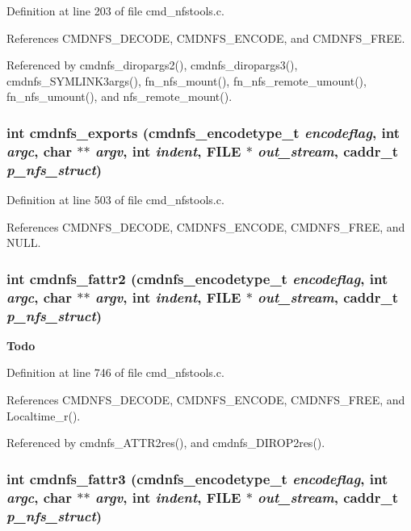 Definition at line 203 of file cmd\_\-nfstools.c.

References CMDNFS\_\-DECODE, CMDNFS\_\-ENCODE, and CMDNFS\_\-FREE.

Referenced by cmdnfs\_\-diropargs2(), cmdnfs\_\-diropargs3(), cmdnfs\_\-SYMLINK3args(), fn\_\-nfs\_\-mount(), fn\_\-nfs\_\-remote\_\-umount(), fn\_\-nfs\_\-umount(), and nfs\_\-remote\_\-mount().
\subsubsection{\setlength{\rightskip}{0pt plus 5cm}int cmdnfs\_\-exports ({\bf cmdnfs\_\-encodetype\_\-t} {\em encodeflag}, int {\em argc}, char $\ast$$\ast$ {\em argv}, int {\em indent}, FILE $\ast$ {\em out\_\-stream}, caddr\_\-t {\em p\_\-nfs\_\-struct})}\label{cmd__nfstools_8h_a20}




Definition at line 503 of file cmd\_\-nfstools.c.

References CMDNFS\_\-DECODE, CMDNFS\_\-ENCODE, CMDNFS\_\-FREE, and NULL.
\subsubsection{\setlength{\rightskip}{0pt plus 5cm}int cmdnfs\_\-fattr2 ({\bf cmdnfs\_\-encodetype\_\-t} {\em encodeflag}, int {\em argc}, char $\ast$$\ast$ {\em argv}, int {\em indent}, FILE $\ast$ {\em out\_\-stream}, caddr\_\-t {\em p\_\-nfs\_\-struct})}\label{cmd__nfstools_8h_a23}


\begin{Desc}
\item[{\bf Todo}]\end{Desc}


Definition at line 746 of file cmd\_\-nfstools.c.

References CMDNFS\_\-DECODE, CMDNFS\_\-ENCODE, CMDNFS\_\-FREE, and Localtime\_\-r().

Referenced by cmdnfs\_\-ATTR2res(), and cmdnfs\_\-DIROP2res().
\subsubsection{\setlength{\rightskip}{0pt plus 5cm}int cmdnfs\_\-fattr3 ({\bf cmdnfs\_\-encodetype\_\-t} {\em encodeflag}, int {\em argc}, char $\ast$$\ast$ {\em argv}, int {\em indent}, FILE $\ast$ {\em out\_\-stream}, caddr\_\-t {\em p\_\-nfs\_\-struct})}\label{cmd__nfstools_8h_a35}



